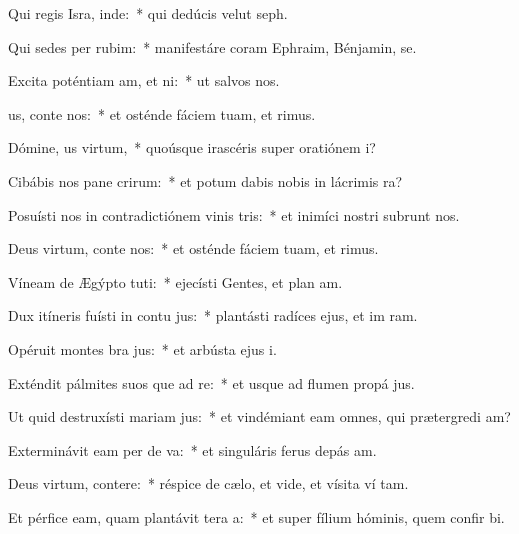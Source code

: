 \item Qui regis Isra, inde:~* qui dedúcis velut  seph.
\item Qui sedes per rubim:~* manifestáre coram Ephraim, Bénjamin,  se.
\item Excita poténtiam am, et ni:~* ut salvos  nos.
\item {}us, conte nos:~* et osténde fáciem tuam, et  rimus.
\item Dómine, us virtum,~* quoúsque irascéris super oratiónem  i?
\item Cibábis nos pane crirum:~* et potum dabis nobis in lácrimis  ra?
\item Posuísti nos in contradictiónem vinis tris:~* et inimíci nostri subrunt nos.
\item Deus virtum, conte nos:~* et osténde fáciem tuam, et  rimus.
\item Víneam de Ægýpto tuti:~* ejecísti Gentes, et plan am.
\item Dux itíneris fuísti in contu jus:~* plantásti radíces ejus, et im ram.
\item Opéruit montes bra jus:~* et arbústa ejus  i.
\item Exténdit pálmites suos que ad re:~* et usque ad flumen propá jus.
\item Ut quid destruxísti mariam jus:~* et vindémiant eam omnes, qui prætergredi am?
\item Exterminávit eam per de va:~* et singuláris ferus depás  am.
\item Deus virtum, contere:~* réspice de cælo, et vide, et vísita ví tam.
\item Et pérfice eam, quam plantávit tera a:~* et super fílium hóminis, quem confir bi.
